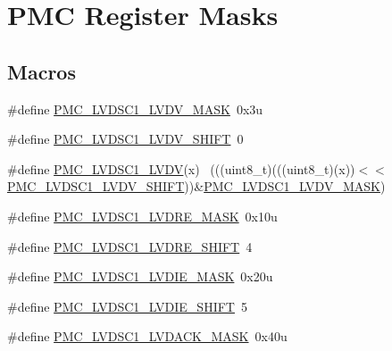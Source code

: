 \hypertarget{group___p_m_c___register___masks}{}\section{P\+MC Register Masks}
\label{group___p_m_c___register___masks}
\subsection*{Macros}
\begin{DoxyCompactItemize}
\item 
\#define \hyperlink{group___p_m_c___register___masks_ga777eada2a526d88569a30323e9d3e1d3}{P\+M\+C\+\_\+\+L\+V\+D\+S\+C1\+\_\+\+L\+V\+D\+V\+\_\+\+M\+A\+SK}~0x3u
\item 
\#define \hyperlink{group___p_m_c___register___masks_gaaf45daa6de387f93bc57f1218ab17a16}{P\+M\+C\+\_\+\+L\+V\+D\+S\+C1\+\_\+\+L\+V\+D\+V\+\_\+\+S\+H\+I\+FT}~0
\item 
\#define \hyperlink{group___p_m_c___register___masks_gaa14e8452bdb4c61c57ed23eda94f715a}{P\+M\+C\+\_\+\+L\+V\+D\+S\+C1\+\_\+\+L\+V\+DV}(x)                                          ~(((uint8\+\_\+t)(((uint8\+\_\+t)(x))$<$$<$\hyperlink{group___p_m_c___register___masks_gaaf45daa6de387f93bc57f1218ab17a16}{P\+M\+C\+\_\+\+L\+V\+D\+S\+C1\+\_\+\+L\+V\+D\+V\+\_\+\+S\+H\+I\+FT}))\&\hyperlink{group___p_m_c___register___masks_ga777eada2a526d88569a30323e9d3e1d3}{P\+M\+C\+\_\+\+L\+V\+D\+S\+C1\+\_\+\+L\+V\+D\+V\+\_\+\+M\+A\+SK})
\item 
\#define \hyperlink{group___p_m_c___register___masks_gad771f87e373907e3ef60e5fa31001fad}{P\+M\+C\+\_\+\+L\+V\+D\+S\+C1\+\_\+\+L\+V\+D\+R\+E\+\_\+\+M\+A\+SK}~0x10u
\item 
\#define \hyperlink{group___p_m_c___register___masks_ga056ca878a20782f5bf65b3be3e98581d}{P\+M\+C\+\_\+\+L\+V\+D\+S\+C1\+\_\+\+L\+V\+D\+R\+E\+\_\+\+S\+H\+I\+FT}~4
\item 
\#define \hyperlink{group___p_m_c___register___masks_ga1e7518c88ea0037d099124a643788363}{P\+M\+C\+\_\+\+L\+V\+D\+S\+C1\+\_\+\+L\+V\+D\+I\+E\+\_\+\+M\+A\+SK}~0x20u
\item 
\#define \hyperlink{group___p_m_c___register___masks_ga30ca240c9254a7e76123a3cf2bfdc40e}{P\+M\+C\+\_\+\+L\+V\+D\+S\+C1\+\_\+\+L\+V\+D\+I\+E\+\_\+\+S\+H\+I\+FT}~5
\item 
\#define \hyperlink{group___p_m_c___register___masks_ga65d04677ca16ad916563d6673cb8ecaa}{P\+M\+C\+\_\+\+L\+V\+D\+S\+C1\+\_\+\+L\+V\+D\+A\+C\+K\+\_\+\+M\+A\+SK}~0x40u
$$
\end{DoxyCompactItemize}
